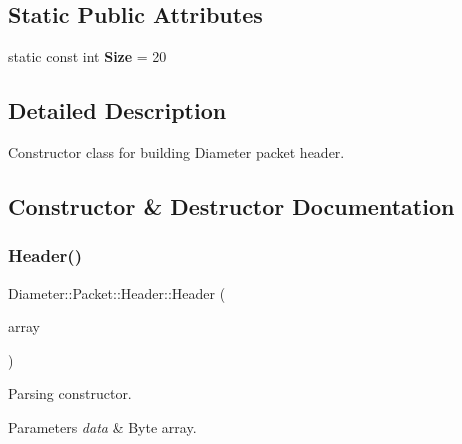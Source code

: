 \subsection*{Static Public Attributes}
\begin{DoxyCompactItemize}
\item 
\mbox{\label{classDiameter_1_1Packet_1_1Header_aad3e00a9dd6f9934b4a0c31125c63e26}} 
static const int {\bfseries Size} = 20
\end{DoxyCompactItemize}


\subsection{Detailed Description}
Constructor class for building Diameter packet header. 

\subsection{Constructor \& Destructor Documentation}
\mbox{\label{classDiameter_1_1Packet_1_1Header_a730fdd42fba72b5d6a366d939753c258}} 
\subsubsection{\texorpdfstring{Header()}{Header()}\hspace{0.1cm}{\footnotesize\ttfamily [1/3]}}
{\footnotesize\ttfamily Diameter\+::\+Packet\+::\+Header\+::\+Header (\begin{DoxyParamCaption}\item[{const Byte\+Array \&}]{array }\end{DoxyParamCaption})\hspace{0.3cm}{\ttfamily [explicit]}}



Parsing constructor. 


\begin{DoxyParams}{Parameters}
{\em data} & Byte array. \\
\hline
\end{DoxyParams}
\mbox{\label{classDiameter_1_1Packet_1_1Header_ac7eaf975b01659bc10c2ce5d20ad926d}} 

